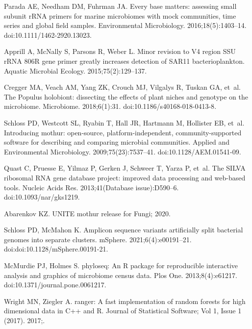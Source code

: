 \documentclass[
  10pt,
  letterpaper,
]{article}
\begin{document}
\begin{thebibliography}{10}
  Parada AE, Needham DM, Fuhrman JA.
  \newblock Every base matters: assessing small subunit {rRNA} primers for marine
    microbiomes with mock communities, time series and global field samples.
  \newblock Environmental Microbiology. 2016;18(5):1403--14.
  \newblock doi:{10.1111/1462-2920.13023}.
  
  Apprill A, McNally S, Parsons R, Weber L.
  \newblock Minor revision to {V4} region {SSU} {rRNA} {806R} gene primer greatly
    increases detection of {SAR11} bacterioplankton.
  \newblock Aquatic Microbial Ecology. 2015;75(2):129--137.
  
  Cregger MA, Veach AM, Yang ZK, Crouch MJ, Vilgalys R, Tuskan GA, et~al.
  \newblock The {Populus} holobiont: dissecting the effects of plant niches and
    genotype on the microbiome.
  \newblock Microbiome. 2018;6(1):31.
  \newblock doi:{10.1186/s40168-018-0413-8}.
  
  Schloss PD, Westcott SL, Ryabin T, Hall JR, Hartmann M, Hollister EB, et~al.
  \newblock Introducing mothur: open-source, platform-independent,
    community-supported software for describing and comparing microbial
    communities.
  \newblock Applied and Environmental Microbiology. 2009;75(23):7537--41.
  \newblock doi:{10.1128/AEM.01541-09}.
  
  Quast C, Pruesse E, Yilmaz P, Gerken J, Schweer T, Yarza P, et~al.
  \newblock The {SILVA} ribosomal {RNA} gene database project: improved data
    processing and web-based tools.
  \newblock Nucleic Acids Res. 2013;41(Database issue):D590--6.
  \newblock doi:{10.1093/nar/gks1219}.
  
  Abarenkov KZ. {UNITE} mothur release for {Fungi}; 2020.
  
  Schloss PD, McMahon K.
  \newblock Amplicon sequence variants artificially split bacterial genomes into
    separate clusters.
  \newblock mSphere. 2021;6(4):e00191--21.
  \newblock doi:{doi:10.1128/mSphere.00191-21}.
  
  McMurdie PJ, Holmes S.
  \newblock phyloseq: {An} {R} package for reproducible interactive analysis and
    graphics of microbiome census data.
  \newblock Plos One. 2013;8(4):e61217.
  \newblock doi:{10.1371/journal.pone.0061217}.
  
  Wright MN, Ziegler A.
  \newblock ranger: {A} fast implementation of random forests for high
    dimensional data in {C}++ and {R}.
  \newblock Journal of Statistical Software; Vol 1, Issue 1 (2017). 2017;.
  

\end{thebibliography}
\end{document}
